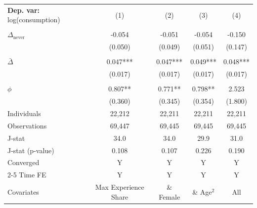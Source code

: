 \begin{tabular}{l cccc} \toprule  \textbf{Dep. var:}  log(consumption) 
                    &\multicolumn{1}{c}{(1)}   &\multicolumn{1}{c}{(2)}   &\multicolumn{1}{c}{(3)}   &\multicolumn{1}{c}{(4)}   \\
                    &               &               &               &               \\
\addlinespace
$\Delta_{\text{never}}$&      -0.054   &      -0.051   &      -0.054   &      -0.150   \\
                    &     (0.050)   &     (0.049)   &     (0.051)   &     (0.147)   \\
                    &               &               &               &               \\
\addlinespace
$\bar{\Delta}$      &       0.047***&       0.047***&       0.049***&       0.048***\\
                    &     (0.017)   &     (0.017)   &     (0.017)   &     (0.017)   \\
                    &               &               &               &               \\
\addlinespace
$\phi$              &       0.807** &       0.771** &       0.798** &       2.523   \\
                    &     (0.360)   &     (0.345)   &     (0.354)   &     (1.800)   \\
\addlinespace
Individuals         &      22,212   &      22,211   &      22,211   &      22,211   \\
Observations        &      69,447   &      69,445   &      69,445   &      69,445   \\
J-stat              &        34.0   &        34.0   &        29.9   &        31.0   \\
J-stat (p-value)    &       0.108   &       0.107   &       0.226   &       0.190   \\
Converged           &           Y   &           Y   &           Y   &           Y   \\
\cmidrule{2-5} Time FE & Y & Y & Y & Y \\ Covariates & Max Experience Share & \& Female & \& Age$^2$ & All \\ \bottomrule \end{tabular}
